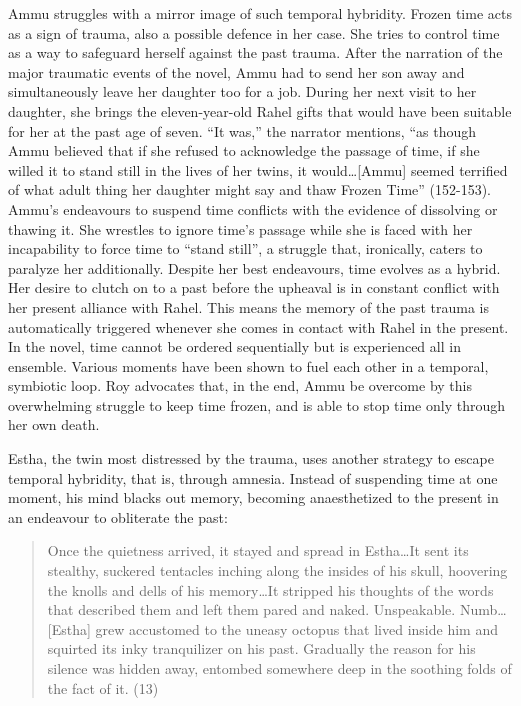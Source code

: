 Ammu struggles with a mirror image of such temporal hybridity. Frozen time acts as a sign of trauma, also a possible defence in her case. She tries to control time as a way to safeguard herself against the past trauma. After the narration of the major traumatic events of the novel, Ammu had to send her son away and simultaneously leave her daughter too for a job. During her next visit to her daughter, she brings the eleven-year-old Rahel gifts that would have been suitable for her at the past age of seven. “It was,” the narrator mentions, “as though Ammu believed that if she refused to acknowledge the passage of time, if she willed it to stand still in the lives of her twins, it would\ldots [Ammu] seemed terrified of what adult thing her daughter might say and thaw Frozen Time” (152-153). Ammu’s endeavours to suspend time conflicts with the evidence of dissolving or thawing it. She wrestles to ignore time’s passage while she is faced with her incapability to force time to “stand still”, a struggle that, ironically, caters to paralyze her additionally. Despite her best endeavours, time evolves as a hybrid. Her desire to clutch on to a past before the upheaval is in constant conflict with her present alliance with Rahel. This means the memory of the past trauma is automatically triggered whenever she comes in contact with Rahel in the present. In the novel, time cannot be ordered sequentially but is experienced all in ensemble. Various moments have been shown to fuel each other in a temporal, symbiotic loop. Roy advocates that, in the end, Ammu be overcome by this overwhelming struggle to keep time frozen, and is able to stop time only through her own death.

Estha, the twin most distressed by the trauma, uses another strategy to escape temporal hybridity, that is, through amnesia. Instead of suspending time at one moment, his mind blacks out memory, becoming anaesthetized to the present in an endeavour to obliterate the past: 

\begin{quote}
  Once the quietness arrived, it stayed and spread in Estha\ldots It sent its stealthy, suckered tentacles inching along the insides of his skull, hoovering the knolls and dells of his memory\ldots It stripped his thoughts of the words that described them and left them pared and naked. Unspeakable. Numb\ldots[Estha] grew accustomed to the uneasy octopus that lived inside him and squirted its inky tranquilizer on his past. Gradually the reason for his silence was hidden away, entombed somewhere deep in the soothing folds of the fact of it. (13)
\end{quote}

